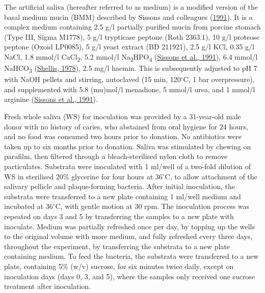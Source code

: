 \documentclass[
  letterpaper,
]{book}
\begin{document}
The artificial saliva (hereafter referred to as medium) is a modified
version of the basal medium mucin (BMM) described by Sissons and
colleagues
(\protect\hyperlink{ref-sissonsMultistationPlaque1991}{1991}). It is a
complex medium containing 2.5 g/l partially purified mucin from porcine
stomach (Type III, Sigma M1778), 5 g/l trypticase peptone (Roth 2363.1),
10 g/l proteose peptone (Oxoid LP0085), 5 g/l yeast extract (BD 211921),
2.5 g/l KCl, 0.35 g/l NaCl, 1.8 mmol/l CaCl\textsubscript{2}, 5.2 mmol/l
Na\textsubscript{2}HPO\textsubscript{4}
(\protect\hyperlink{ref-sissonsMultistationPlaque1991}{Sissons et al.,
1991}), 6.4 mmol/l NaHCO\textsubscript{3}
(\protect\hyperlink{ref-shellisSyntheticSaliva1978}{Shellis, 1978}), 2.5
mg/l haemin. This is subsequently adjusted to pH 7 with NaOH pellets and
stirring, autoclaved (15 min, 120\(^{\circ}\)C, 1 bar overpressure), and
supplemented with 5.8 (mu)mol/l menadione, 5 mmol/l urea, and 1 mmol/l
arginine (\protect\hyperlink{ref-sissonsMultistationPlaque1991}{Sissons
et al., 1991}).

Fresh whole saliva (WS) for inoculation was provided by a 31-year-old
male donor with no history of caries, who abstained from oral hygiene
for 24 hours, and no food was consumed two hours prior to donation. No
antibiotics were taken up to six months prior to donation. Saliva was
stimulated by chewing on parafilm, then filtered through a
bleach-sterilised nylon cloth to remove particulates. Substrata were
inoculated with 1 ml/well of a two-fold dilution of WS in sterilised
20\% glycerine for four hours at 36\(^{\circ}\)C, to allow attachment of
the salivary pellicle and plaque-forming bacteria. After initial
inoculation, the substrata were transferred to a new plate containing 1
ml/well medium and incubated at 36\(^{\circ}\)C, with gentle motion at
30 rpm. The inoculation process was repeated on days 3 and 5 by
transferring the samples to a new plate with inoculate. Medium was
partially refreshed once per day, by topping up the wells to the
original volume with more medium, and fully refreshed every three days,
throughout the experiment, by transferring the substrata to a new plate
containing medium. To feed the bacteria, the substrata were transferred
to a new plate, containing 5\% (w/v) sucrose, for six minutes twice
daily, except on inoculation days (days 0, 3, and 5), where the samples
only received one sucrose treatment after inoculation.
\end{document}

